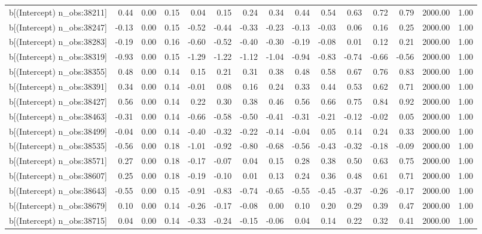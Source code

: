 \begin{table}[ht]
\begin{tabular}{rrrrrrrrrrrrrrr}
  b[(Intercept) n\_obs:38211] & 0.44 & 0.00 & 0.15 & 0.04 & 0.15 & 0.24 & 0.34 & 0.44 & 0.54 & 0.63 & 0.72 & 0.79 & 2000.00 & 1.00 \\ 
  b[(Intercept) n\_obs:38247] & -0.13 & 0.00 & 0.15 & -0.52 & -0.44 & -0.33 & -0.23 & -0.13 & -0.03 & 0.06 & 0.16 & 0.25 & 2000.00 & 1.00 \\ 
  b[(Intercept) n\_obs:38283] & -0.19 & 0.00 & 0.16 & -0.60 & -0.52 & -0.40 & -0.30 & -0.19 & -0.08 & 0.01 & 0.12 & 0.21 & 2000.00 & 1.00 \\ 
  b[(Intercept) n\_obs:38319] & -0.93 & 0.00 & 0.15 & -1.29 & -1.22 & -1.12 & -1.04 & -0.94 & -0.83 & -0.74 & -0.66 & -0.56 & 2000.00 & 1.00 \\ 
  b[(Intercept) n\_obs:38355] & 0.48 & 0.00 & 0.14 & 0.15 & 0.21 & 0.31 & 0.38 & 0.48 & 0.58 & 0.67 & 0.76 & 0.83 & 2000.00 & 1.00 \\ 
  b[(Intercept) n\_obs:38391] & 0.34 & 0.00 & 0.14 & -0.01 & 0.08 & 0.16 & 0.24 & 0.33 & 0.44 & 0.53 & 0.62 & 0.71 & 2000.00 & 1.00 \\ 
  b[(Intercept) n\_obs:38427] & 0.56 & 0.00 & 0.14 & 0.22 & 0.30 & 0.38 & 0.46 & 0.56 & 0.66 & 0.75 & 0.84 & 0.92 & 2000.00 & 1.00 \\ 
  b[(Intercept) n\_obs:38463] & -0.31 & 0.00 & 0.14 & -0.66 & -0.58 & -0.50 & -0.41 & -0.31 & -0.21 & -0.12 & -0.02 & 0.05 & 2000.00 & 1.00 \\ 
  b[(Intercept) n\_obs:38499] & -0.04 & 0.00 & 0.14 & -0.40 & -0.32 & -0.22 & -0.14 & -0.04 & 0.05 & 0.14 & 0.24 & 0.33 & 2000.00 & 1.00 \\ 
  b[(Intercept) n\_obs:38535] & -0.56 & 0.00 & 0.18 & -1.01 & -0.92 & -0.80 & -0.68 & -0.56 & -0.43 & -0.32 & -0.18 & -0.09 & 2000.00 & 1.00 \\ 
  b[(Intercept) n\_obs:38571] & 0.27 & 0.00 & 0.18 & -0.17 & -0.07 & 0.04 & 0.15 & 0.28 & 0.38 & 0.50 & 0.63 & 0.75 & 2000.00 & 1.00 \\ 
  b[(Intercept) n\_obs:38607] & 0.25 & 0.00 & 0.18 & -0.19 & -0.10 & 0.01 & 0.13 & 0.24 & 0.36 & 0.48 & 0.61 & 0.71 & 2000.00 & 1.00 \\ 
  b[(Intercept) n\_obs:38643] & -0.55 & 0.00 & 0.15 & -0.91 & -0.83 & -0.74 & -0.65 & -0.55 & -0.45 & -0.37 & -0.26 & -0.17 & 2000.00 & 1.00 \\ 
  b[(Intercept) n\_obs:38679] & 0.10 & 0.00 & 0.14 & -0.26 & -0.17 & -0.08 & 0.00 & 0.10 & 0.20 & 0.29 & 0.39 & 0.47 & 2000.00 & 1.00 \\ 
  b[(Intercept) n\_obs:38715] & 0.04 & 0.00 & 0.14 & -0.33 & -0.24 & -0.15 & -0.06 & 0.04 & 0.14 & 0.22 & 0.32 & 0.41 & 2000.00 & 1.00 \\ 

\end{tabular}
\end{table}
